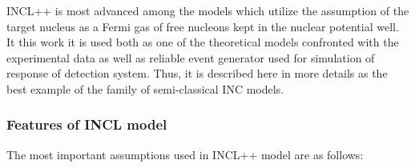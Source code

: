 INCL++ is most advanced among the models which utilize the assumption of the target nucleus as a Fermi gas of free nucleons kept in the nuclear potential well.
It this work it is used both as one of the theoretical models confronted with the experimental data as well as reliable event generator used for simulation of 
response of detection system.
Thus, it is described here in more details as the best example of the family of semi-classical INC models.  


\subsubsection{Features of INCL model}\label{FeaOFINCL}

The most important assumptions used in INCL++ model are as follows:

